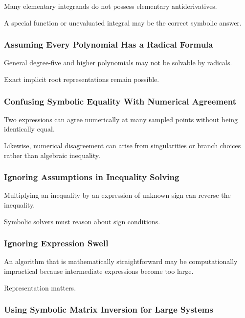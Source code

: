 Many elementary integrands do not possess elementary antiderivatives.

A special function or unevaluated integral may be the correct symbolic
answer.

\subsubsection{Assuming Every Polynomial Has a Radical Formula}

General degree-five and higher polynomials may not be solvable by radicals.

Exact implicit root representations remain possible.

\subsubsection{Confusing Symbolic Equality With Numerical Agreement}

Two expressions can agree numerically at many sampled points without being
identically equal.

Likewise, numerical disagreement can arise from singularities or branch
choices rather than algebraic inequality.

\subsubsection{Ignoring Assumptions in Inequality Solving}

Multiplying an inequality by an expression of unknown sign can reverse the
inequality.

Symbolic solvers must reason about sign conditions.

\subsubsection{Ignoring Expression Swell}

An algorithm that is mathematically straightforward may be computationally
impractical because intermediate expressions become too large.

Representation matters.

\subsubsection{Using Symbolic Matrix Inversion for Large Systems}

